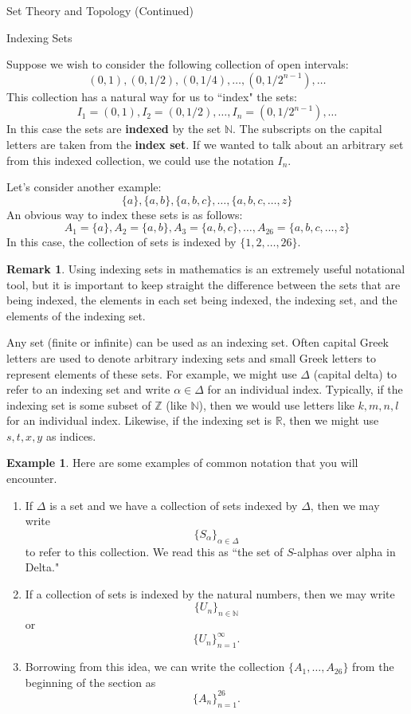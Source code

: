 \documentclass[11pt]{article}
\theoremstyle{definition}
\newtheorem{example}[theorem]{Example}
\newtheorem{remark}[theorem]{Remark}
\begin{document}
\addtocounter{section}{1}

\begin{section}{Set Theory and Topology (Continued)}

\addtocounter{subsection}{2}
\addtocounter{theorem}{44}

\begin{subsection}{Indexing Sets}

Suppose we wish to consider the following collection of open intervals:
\[
(0,1), (0,1/2), (0,1/4), \ldots, (0,1/2^{n-1}), \ldots
\]
This collection has a natural way for us to ``index" the sets:
\[
I_1=(0,1), I_2=(0,1/2), \ldots, I_n=(0,1/2^{n-1}), \ldots
\]
In this case the sets are \textbf{indexed} by the set $\mathbb{N}$.  The subscripts on the capital letters are taken from the \textbf{index set}.  If we wanted to talk about an arbitrary set from this indexed collection, we could use the notation $I_n$.

Let's consider another example:
\[
\{a\}, \{a,b\}, \{a,b,c\}, \ldots, \{a,b,c,\ldots,z\}
\]
An obvious way to index these sets is as follows:
\[
A_1=\{a\}, A_2=\{a,b\}, A_3=\{a,b,c\}, \ldots, A_{26}=\{a,b,c,\ldots,z\}
\]
In this case, the collection of sets is indexed by $\{1,2,\ldots, 26\}$.

\begin{remark}
Using indexing sets in mathematics is an extremely useful notational tool, but it is important to keep straight the difference between the sets that are being indexed, the elements in each set being indexed, the indexing set, and the elements of the indexing set.
\end{remark}

Any set (finite or infinite) can be used as an indexing set.  Often capital Greek letters are used to denote arbitrary indexing sets and small Greek letters to represent elements of these sets.  For example, we might use $\Delta$ (capital delta) to refer to an indexing set and write $\alpha \in \Delta$ for an individual index.  Typically, if the indexing set is some subset of $\mathbb{Z}$ (like $\mathbb{N}$), then we would use letters like $k,m,n,l$ for an individual index.  Likewise, if the indexing set is $\mathbb{R}$, then we might use $s,t,x,y$ as indices.  

\begin{example}
Here are some examples of common notation that you will encounter.
\begin{enumerate}
\item If $\Delta$ is a set and we have a collection of sets indexed by $\Delta$, then we may write
\[
\{S_{\alpha}\}_{\alpha\in \Delta}
\]
to refer to this collection.  We read this as ``the set of $S$-alphas over alpha in Delta."
\item If a collection of sets is indexed by the natural numbers, then we may write
\[
\{U_n\}_{n\in\mathbb{N}}
\]
or
\[
\{U_n\}_{n=1}^{\infty}.
\]
\item Borrowing from this idea, we can write the collection $\{A_1,\ldots,A_{26}\}$ from the beginning of the section as
\[
\{A_n\}_{n=1}^{26}.
\]


\end{enumerate}
\end{example}
\end{subsection}
\end{section}
\end{document}
